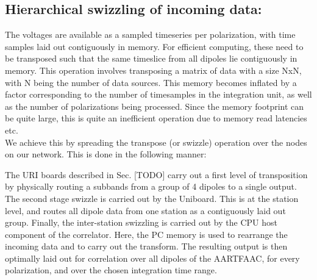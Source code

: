 \documentclass{ws-jai}
\begin{document}
\subsection {Hierarchical swizzling of incoming data:} The voltages are available as
a sampled timeseries  per polarization, with time samples  laid out contiguously
in memory.  For  efficient computing, these need to be  transposed such that the
same  timeslice from  all dipoles  lie  contiguously in  memory. This  operation
involves transposing a matrix  of data with a size NxN, with  N being the number
of data sources.  This memory becomes  inflated by a factor corresponding to the
number  of  timesamples in  the  integration  unit, as  well  as  the number  of
polarizations being  processed. Since the  memory footprint can be  quite large,
this is quite an inefficient operation due to memory read latencies etc.\\

We achieve this by spreading the transpose (or swizzle) operation over the nodes
on our network. This is done in the following manner:
   
The  URI  boards  described  in  Sec.    [TODO]  carry  out  a  first  level  of
transposition by physically  routing a subbands from  a group of 4  dipoles to a
single output. The second stage swizzle is  carried out by the Uniboard. This is
at  the  station level,  and  routes  all dipole  data  from  one station  as  a
contiguously laid out group. Finally, the inter-station swizzling is carried out
by the  CPU host component  of the  correlator. Here, the  PC memory is  used to
rearrange the incoming data and to carry out the transform. The resulting output
is then optimally laid out for correlation over all dipoles of the AARTFAAC, for
every polarization, and over the chosen integration time range.

\end{document}
